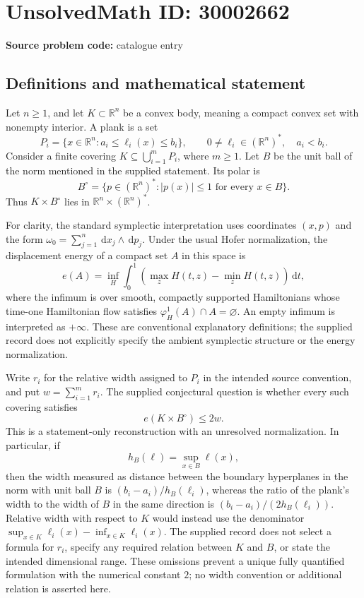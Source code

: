\documentclass[11pt]{article}
\newcommand{\R}{\mathbb{R}}
\newcommand{\dd}{\,\mathrm{d}}
\begin{document}
\section*{UnsolvedMath ID: 30002662}
\textbf{Source problem code:} catalogue entry
\subsection{Definitions and mathematical statement}
Let \(n\geq 1\), and let \(K\subset\R^n\) be a convex body, meaning a compact convex set with nonempty interior. A plank is a set
\[
P_i=\{x\in\R^n:a_i\leq\ell_i(x)\leq b_i\},
\qquad 0\neq\ell_i\in(\R^n)^*,\quad a_i<b_i.
\]
Consider a finite covering \(K\subseteq\bigcup_{i=1}^{m}P_i\), where \(m\geq1\). Let \(B\) be the unit ball of the norm mentioned in the supplied statement. Its polar is
\[
B^\circ=\{p\in(\R^n)^*:|p(x)|\leq1\text{ for every }x\in B\}.
\]
Thus \(K\times B^\circ\) lies in \(\R^n\times(\R^n)^*\).

For clarity, the standard symplectic interpretation uses coordinates \((x,p)\) and the form \(\omega_0=\sum_{j=1}^{n}\dd x_j\wedge\dd p_j\). Under the usual Hofer normalization, the displacement energy of a compact set \(A\) in this space is
\[
e(A)=\inf_H\int_0^1\left(\max_z H(t,z)-\min_z H(t,z)\right)\dd t,
\]
where the infimum is over smooth, compactly supported Hamiltonians whose time-one Hamiltonian flow satisfies \(\varphi_H^1(A)\cap A=\varnothing\). An empty infimum is interpreted as \(+\infty\). These are conventional explanatory definitions; the supplied record does not explicitly specify the ambient symplectic structure or the energy normalization.

Write \(r_i\) for the relative width assigned to \(P_i\) in the intended source convention, and put \(w=\sum_{i=1}^{m}r_i\). The supplied conjectural question is whether every such covering satisfies
\[
e(K\times B^\circ)\leq2w.
\]
This is a statement-only reconstruction with an unresolved normalization. In particular, if
\[
h_B(\ell)=\sup_{x\in B}\ell(x),
\]
then the width measured as distance between the boundary hyperplanes in the norm with unit ball \(B\) is \((b_i-a_i)/h_B(\ell_i)\), whereas the ratio of the plank's width to the width of \(B\) in the same direction is \((b_i-a_i)/(2h_B(\ell_i))\). Relative width with respect to \(K\) would instead use the denominator \(\sup_{x\in K}\ell_i(x)-\inf_{x\in K}\ell_i(x)\). The supplied record does not select a formula for \(r_i\), specify any required relation between \(K\) and \(B\), or state the intended dimensional range. These omissions prevent a unique fully quantified formulation with the numerical constant \(2\); no width convention or additional relation is asserted here.
\end{document}
